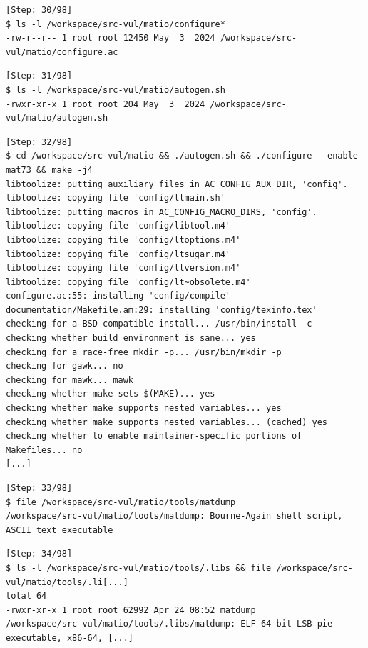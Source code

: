 \begin{tcolorbox}[enhanced,title={Example of compiling the project and constructing PoCs with Python}]
\begin{verbatim}
[Step: 30/98]
$ ls -l /workspace/src-vul/matio/configure*
-rw-r--r-- 1 root root 12450 May  3  2024 /workspace/src-vul/matio/configure.ac
\end{verbatim}
\begin{verbatim}
[Step: 31/98]
$ ls -l /workspace/src-vul/matio/autogen.sh
-rwxr-xr-x 1 root root 204 May  3  2024 /workspace/src-vul/matio/autogen.sh
\end{verbatim}
\begin{verbatim}
[Step: 32/98]
$ cd /workspace/src-vul/matio && ./autogen.sh && ./configure --enable-mat73 && make -j4
libtoolize: putting auxiliary files in AC_CONFIG_AUX_DIR, 'config'.
libtoolize: copying file 'config/ltmain.sh'
libtoolize: putting macros in AC_CONFIG_MACRO_DIRS, 'config'.
libtoolize: copying file 'config/libtool.m4'
libtoolize: copying file 'config/ltoptions.m4'
libtoolize: copying file 'config/ltsugar.m4'
libtoolize: copying file 'config/ltversion.m4'
libtoolize: copying file 'config/lt~obsolete.m4'
configure.ac:55: installing 'config/compile'
documentation/Makefile.am:29: installing 'config/texinfo.tex'
checking for a BSD-compatible install... /usr/bin/install -c
checking whether build environment is sane... yes
checking for a race-free mkdir -p... /usr/bin/mkdir -p
checking for gawk... no
checking for mawk... mawk
checking whether make sets $(MAKE)... yes
checking whether make supports nested variables... yes
checking whether make supports nested variables... (cached) yes
checking whether to enable maintainer-specific portions of Makefiles... no
[...]
\end{verbatim}
\begin{verbatim}
[Step: 33/98]
$ file /workspace/src-vul/matio/tools/matdump
/workspace/src-vul/matio/tools/matdump: Bourne-Again shell script, ASCII text executable
\end{verbatim}
\begin{verbatim}
[Step: 34/98]
$ ls -l /workspace/src-vul/matio/tools/.libs && file /workspace/src-vul/matio/tools/.li[...]
total 64
-rwxr-xr-x 1 root root 62992 Apr 24 08:52 matdump
/workspace/src-vul/matio/tools/.libs/matdump: ELF 64-bit LSB pie executable, x86-64, [...]
\end{verbatim}


\end{tcolorbox}
